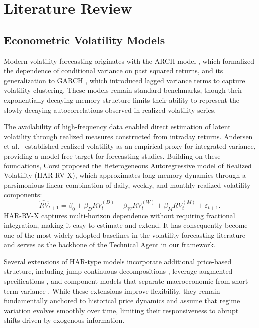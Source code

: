 \documentclass[review]{elsarticle}
\begin{document}
\section{Literature Review}\label{literature-review}

\subsection{Econometric Volatility Models}\label{econometric-volatility-models}

Modern volatility forecasting originates with the ARCH model \cite{engle1982}, which formalized the dependence of conditional variance on past squared returns, and its generalization to GARCH \cite{bollerslev1986}, which introduced lagged variance terms to capture volatility clustering. These models remain standard benchmarks, though their exponentially decaying memory structure limits their ability to represent the slowly decaying autocorrelations observed in realized volatility series.

The availability of high-frequency data enabled direct estimation of latent volatility through realized measures constructed from intraday returns. Andersen et al.~\cite{andersen2001} established realized volatility as an empirical proxy for integrated variance, providing a model-free target for forecasting studies. Building on these foundations, Corsi \cite{corsi2009} proposed the Heterogeneous Autoregressive model of Realized Volatility (HAR-RV-X), which approximates long-memory dynamics through a parsimonious linear combination of daily, weekly, and monthly realized volatility components:
\begin{equation}
\widehat{RV}_{t+1} = \beta_0 + \beta_D RV_t^{(D)} + \beta_W RV_t^{(W)} + \beta_M RV_t^{(M)} + \varepsilon_{t+1}.
\end{equation}
HAR-RV-X captures multi-horizon dependence without requiring fractional integration, making it easy to estimate and extend. It has consequently become one of the most widely adopted baselines in the volatility forecasting literature and serves as the backbone of the Technical Agent in our framework.

Several extensions of HAR-type models incorporate additional price-based structure, including jump-continuous decompositions \cite{andersen2007}, leverage-augmented specifications \cite{patton2015}, and component models that separate macroeconomic from short-term variance \cite{engle2008}. While these extensions improve flexibility, they remain fundamentally anchored to historical price dynamics and assume that regime variation evolves smoothly over time, limiting their responsiveness to abrupt shifts driven by exogenous information.
\end{document}
